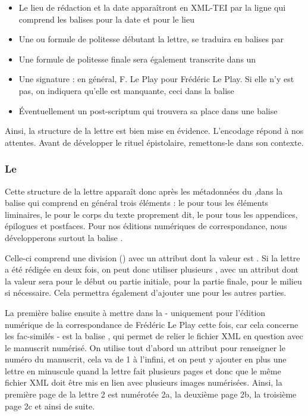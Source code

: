 \begin{itemize}
    \item Le lieu de rédaction et la date apparaîtront en XML-TEI par la ligne  qui comprend les balises  pour la date et  pour le lieu
    \item Une  ou formule de politesse débutant la lettre, se traduira en balises par 
    \item Une formule de politesse finale sera également transcrite dans un 
    \item Une signature : en général, F. Le Play pour Frédéric Le Play. Si elle n'y est pas, on indiquera qu'elle est manquante, ceci dans la balise 
    \item Éventuellement un post-scriptum qui trouvera sa place dans une balise 
\end{itemize}

Ainsi, la structure de la lettre est bien mise en évidence. L'encodage répond à nos attentes. Avant de développer le rituel épistolaire, remettons-le dans son contexte.\\

\subsubsection{Le }
Cette structure de la lettre apparaît donc après les métadonnées du ,dans la balise  qui comprend en général trois éléments : le  pour tous les éléments liminaires, le  pour le corps du texte proprement dit, le  pour tous les appendices, épilogues et postfaces. Pour nos éditions numériques de correspondance, nous développerons surtout la balise .

Celle-ci comprend une division () avec un attribut  dont la valeur est . Si la lettre a été rédigée en deux fois, on peut donc utiliser plusieurs , avec un attribut  dont la valeur sera  pour le début ou partie initiale,  pour la partie finale,  pour le milieu si nécessaire. Cela permettra également d'ajouter une  pour les autres parties.

La première balise ensuite à mettre dans la  - uniquement pour l'édition numérique de la correspondance de Frédéric Le Play cette fois, car cela concerne les fac-similés - est la balise , qui permet de relier le fichier XML en question avec le manuscrit numérisé. On utilise tout d'abord un attribut  pour renseigner le numéro du manuscrit, cela va de 1 à l'infini, et on peut y ajouter en plus une lettre en minuscule quand la lettre fait plusieurs pages et donc que le même fichier XML doit être mis en lien avec plusieurs images numérisées. Ainsi, la première page de la lettre 2 est numérotée 2a, la deuxième page 2b, la troisième page 2c et ainsi de suite.

